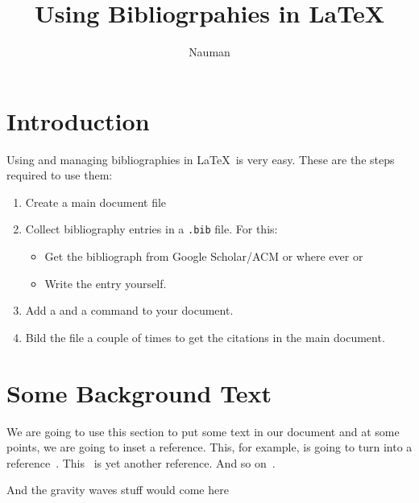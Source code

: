 \documentclass{article}
\begin{document}
\title{Using Bibliogrpahies in \LaTeX}
\author{Nauman}
\maketitle


\section{Introduction} 
Using and managing bibliographies in \LaTeX\ is very easy. These are the steps required to use them: 

\begin{enumerate}
	\item Create a main document file 
	\item Collect bibliography entries in a \verb|.bib| file. For this: 
	   \begin{itemize}
	     \item Get the bibliograph  from Google Scholar/ACM or where ever or 
	     \item Write the entry yourself. 
     \end{itemize}
	\item Add a \verb|| and a \verb|| command to your document. 
	\item Bild the file a couple of times to get the citations in the main document. 
\end{enumerate}

\section{Some Background Text}
We are going to use this section to put some text in our document and at some points, we are going to inset a reference. This, for example, is going to turn into a reference~\cite{Control-CDW-Okamoto-1992}. This~\cite{Lattice-Dynamics-Fehske-2000} is yet another reference. And so on~\cite{Dynamical-Monkowsky-2017}.

And the gravity waves stuff would come here~\cite{Gravity-Wave-2015}






\end{document}
